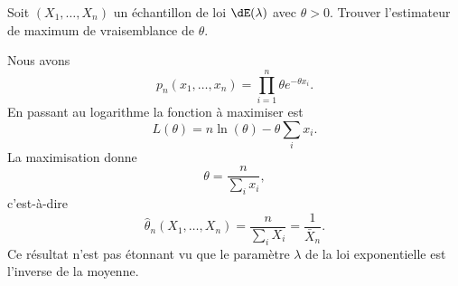 \begin{example}

	Soit \( (X_1,\ldots,X_n)\) un échantillon de loi \( \dE(\lambda)\) avec \( \theta>0\). Trouver l'estimateur de maximum de vraisemblance de \( \theta\).

	Nous avons
	\begin{equation}
		p_n(x_1,\ldots,x_n)=\prod_{i=1}^n\theta e^{-\theta x_i}.
	\end{equation}
	En passant au logarithme la fonction à maximiser est
	\begin{equation}
		L(\theta)=n\ln(\theta)-\theta\sum_i x_i.
	\end{equation}
	La maximisation donne
	\begin{equation}
		\theta=\frac{ n }{ \sum_ix_i },
	\end{equation}
	c'est-à-dire
	\begin{equation}
		\hat\theta_n(X_1,\ldots,X_n)=\frac{ n }{ \sum_iX_i }=\frac{1}{ \bar X_n }.
	\end{equation}
	Ce résultat n'est pas étonnant vu que le paramètre \( \lambda\) de la loi exponentielle est l'inverse de la moyenne.

\end{example}

